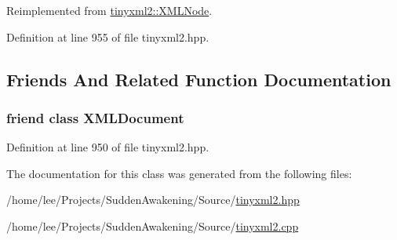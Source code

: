 Reimplemented from \hyperlink{classtinyxml2_1_1_x_m_l_node_a71f5ae90296dbe67979f83fe97073efa}{tinyxml2\-::\-X\-M\-L\-Node}.



Definition at line 955 of file tinyxml2.\-hpp.



\subsection{Friends And Related Function Documentation}
\hypertarget{classtinyxml2_1_1_x_m_l_unknown_a4eee3bda60c60a30e4e8cd4ea91c4c6e}{
\subsubsection[{X\-M\-L\-Document}]{\setlength{\rightskip}{0pt plus 5cm}friend class {\bf X\-M\-L\-Document}\hspace{0.3cm}{\ttfamily [friend]}}}\label{classtinyxml2_1_1_x_m_l_unknown_a4eee3bda60c60a30e4e8cd4ea91c4c6e}


Definition at line 950 of file tinyxml2.\-hpp.



The documentation for this class was generated from the following files\-:\begin{DoxyCompactItemize}
\item 
/home/lee/\-Projects/\-Sudden\-Awakening/\-Source/\hyperlink{tinyxml2_8hpp}{tinyxml2.\-hpp}\item 
/home/lee/\-Projects/\-Sudden\-Awakening/\-Source/\hyperlink{tinyxml2_8cpp}{tinyxml2.\-cpp}\end{DoxyCompactItemize}

